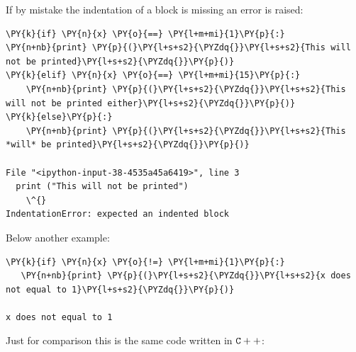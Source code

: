 If by mistake the indentation of a block is missing an error is raised:
\begin{tcolorbox}[breakable, size=fbox, boxrule=1pt, pad at break*=1mm, colback=cellbackground, colframe=cellborder]            
\begin{Verbatim}[commandchars=\\\{\}]
\PY{k}{if} \PY{n}{x} \PY{o}{==} \PY{l+m+mi}{1}\PY{p}{:} 
\PY{n+nb}{print} \PY{p}{(}\PY{l+s+s2}{\PYZdq{}}\PY{l+s+s2}{This will not be printed}\PY{l+s+s2}{\PYZdq{}}\PY{p}{)}
\PY{k}{elif} \PY{n}{x} \PY{o}{==} \PY{l+m+mi}{15}\PY{p}{:}
    \PY{n+nb}{print} \PY{p}{(}\PY{l+s+s2}{\PYZdq{}}\PY{l+s+s2}{This will not be printed either}\PY{l+s+s2}{\PYZdq{}}\PY{p}{)}
\PY{k}{else}\PY{p}{:}
    \PY{n+nb}{print} \PY{p}{(}\PY{l+s+s2}{\PYZdq{}}\PY{l+s+s2}{This *will* be printed}\PY{l+s+s2}{\PYZdq{}}\PY{p}{)}

File "<ipython-input-38-4535a45a6419>", line 3
  print ("This will not be printed")
    \^{}
IndentationError: expected an indented block
\end{Verbatim}
\end{tcolorbox}

Below another example:
\begin{tcolorbox}[breakable, size=fbox, boxrule=1pt, pad at break*=1mm, colback=cellbackground, colframe=cellborder]            
\begin{Verbatim}[commandchars=\\\{\}]
\PY{k}{if} \PY{n}{x} \PY{o}{!=} \PY{l+m+mi}{1}\PY{p}{:}
   \PY{n+nb}{print} \PY{p}{(}\PY{l+s+s2}{\PYZdq{}}\PY{l+s+s2}{x does not equal to 1}\PY{l+s+s2}{\PYZdq{}}\PY{p}{)}

x does not equal to 1
\end{Verbatim}
\end{tcolorbox}

Just for comparison this is the same code written in $\tt{C++}$:

\begin{Shaded}
\begin{Highlighting}[]
\NormalTok{) \{}
\NormalTok{);}
\NormalTok{\}}
 \NormalTok{) \{}
\NormalTok{);}
\NormalTok{\}}
\NormalTok{ \{}
\NormalTok{);}
\NormalTok{\}}
\end{Highlighting}
\end{Shaded}

